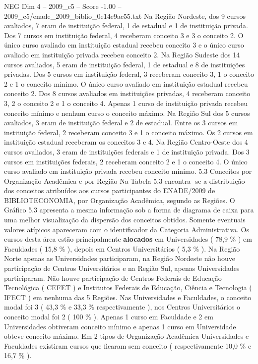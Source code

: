\begin{textsample}{NEG Dim 4 – 2009\_c5 – Score -1.00 – 2009\_c5/enade\_2009\_biblio\_0e14e9ac55.txt}
Na Região Nordeste, dos 9 cursos avaliados, 7 eram de instituição federal, 1 de estadual e 1 de instituição privada.
Dos 7 cursos em instituição federal, 4 receberam conceito 3 e 3 o conceito 2.
O único curso avaliado em instituição estadual recebeu conceito 3 e o único curso avaliado em instituição privada recebeu conceito 2.
Na Região Sudeste dos 14 cursos avaliados, 5 eram de instituição federal, 1 de estadual e 8 de instituições privadas.
Dos 5 cursos em instituição federal, 3 receberam conceito 3, 1 o conceito 2 e 1 o conceito mínimo.
O único curso avaliado em instituição estadual recebeu conceito 2.
Dos 8 cursos avaliados em instituições privadas, 4 receberam conceito 3, 2 o conceito 2 e 1 o conceito 4.
Apenas 1 curso de instituição privada recebeu conceito mínimo e nenhum curso o conceito máximo.
Na Região Sul dos 5 cursos avaliados, 3 eram de instituição federal e 2 de estadual.
Entre os 3 cursos em instituição federal, 2 receberam conceito 3 e 1 o conceito máximo.
Os 2 cursos em instituição estadual receberam os conceitos 3 e 4.
Na Região Centro-Oeste dos 4 cursos avaliados, 3 eram de instituições federais e 1 de instituição privada.
Dos 3 cursos em instituições federais, 2 receberam conceito 2 e 1 o conceito 4.
O único curso avaliado em instituição privada recebeu conceito mínimo. 5.3 Conceitos por Organização Acadêmica e por Região Na Tabela 5.3 encontra -se a distribuição dos conceitos atribuídos aos cursos participantes do ENADE/2009 de BIBLIOTECONOMIA, por Organização Acadêmica, segundo as Regiões.
O Gráfico 5.3 apresenta a mesma informação sob a forma de diagrama de caixa para uma melhor visualização da dispersão dos conceitos obtidos.
Somente eventuais valores atípicos apareceram com o identificador da Categoria Administrativa.
Os cursos desta área estão principalmente \textbf{alocados} em Universidades ( 78,9 \% ) em Faculdades ( 15,8 \% ), depois em Centros Universitários ( 5,3 \% ).
Na Região Norte apenas as Universidades participaram, na Região Nordeste não houve participação de Centros Universitários e na Região Sul, apenas Universidades participaram.
Não houve participação de Centros Federais de Educação Tecnológica ( CEFET ) e Institutos Federais de Educação, Ciência e Tecnologia ( IFECT ) em nenhuma das 5 Regiões.
Nas Universidades e Faculdades, o conceito modal foi 3 ( 43,3 \% e 33,3 \% respectivamente ), nos Centros Universitários o conceito modal foi 2 ( 100 \% ).
Apenas 1 curso em Faculdade e 2 em Universidades obtiveram conceito mínimo e apenas 1 curso em Universidade obteve conceito máximo.
Em 2 tipos de Organização Acadêmica Universidades e Faculdades existiram cursos que ficaram sem conceito ( respectivamente 10,0 \% e 16,7 \% ).

\end{textsample}
